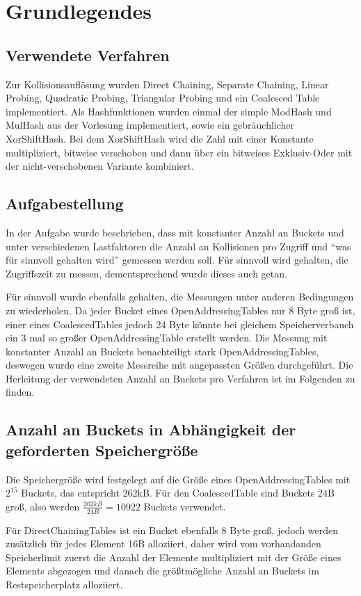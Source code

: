 \chapter{Grundlegendes}
\section{Verwendete Verfahren}
Zur Kollisionsauflösung wurden Direct Chaining, Separate Chaining, Linear Probing, Quadratic Probing, Triangular Probing und ein Coalesced Table implementiert. Als Hashfunktionen wurden einmal der simple ModHash und MulHash aus der Vorlesung implementiert, sowie ein gebräuchlicher XorShiftHash. Bei dem XorShiftHash wird die Zahl mit einer Konstante multipliziert, bitweise verschoben und dann über ein bitweises Exklusiv-Oder mit der nicht-verschobenen Variante kombiniert.
\section{Aufgabestellung}
In der Aufgabe wurde beschrieben, dass mit konstanter Anzahl an Buckets und unter verschiedenen Lastfaktoren die Anzahl an Kollisionen pro Zugriff und \enquote{was für sinnvoll gehalten wird} gemessen werden soll. Für sinnvoll wird gehalten, die Zugriffszeit zu messen, dementsprechend wurde dieses auch getan.

Für sinnvoll wurde ebenfalls gehalten, die Messungen unter anderen Bedingungen zu wiederholen. Da jeder Bucket eines OpenAddressingTables nur 8 Byte groß ist, einer eines CoalescedTables jedoch 24 Byte könnte bei gleichem Speicherverbauch ein 3 mal so großer OpenAddressingTable erstellt werden. Die Messung mit konstanter Anzahl an Buckets benachteiligt stark OpenAddressingTables, deswegen wurde eine zweite Messreihe mit angepassten Größen durchgeführt. Die Herleitung der verwendeten Anzahl an Buckets pro Verfahren ist im Folgenden zu finden.

\section{Anzahl an Buckets in Abhängigkeit der geforderten Speichergröße}
Die Speichergröße wird festgelegt auf die Größe eines OpenAddressingTables mit $2^{15}$ Buckets, das entspricht 262kB. Für den CoalescedTable sind Buckets 24B groß, also werden $\frac{262kB}{24B} = 10922$ Buckets verwendet.

Für DirectChainingTables ist ein Bucket ebenfalls 8 Byte groß, jedoch werden zusätzlich für jedes Element 16B alloziiert, daher wird vom vorhandanden Speicherlimit zuerst die Anzahl der Elemente multipliziert mit der Größe eines Elements abgezogen und danach die größtmögliche Anzahl an Buckets im Restspeicherplatz alloziiert.

